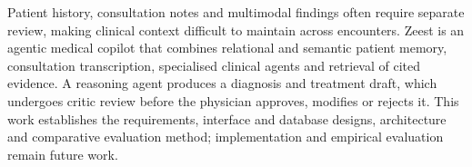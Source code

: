 Patient history, consultation notes and multimodal findings often require separate review, making clinical context difficult to maintain across encounters. Zeest is an agentic medical copilot that combines relational and semantic patient memory, consultation transcription, specialised clinical agents and retrieval of cited evidence. A reasoning agent produces a diagnosis and treatment draft, which undergoes critic review before the physician approves, modifies or rejects it. This work establishes the requirements, interface and database designs, architecture and comparative evaluation method; implementation and empirical evaluation remain future work.
